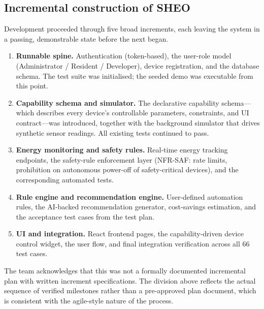 \subsection{Incremental construction of SHEO}

Development proceeded through five broad increments, each leaving the system in a passing,
demonstrable state before the next began.

\begin{enumerate}[leftmargin=*, label=\textbf{Increment \arabic{enumi}.}]
  \item \textbf{Runnable spine.} Authentication (token-based), the user-role model
        (Administrator / Resident / Developer), device registration, and the database
        schema. The test suite was initialised; the seeded demo was executable from this
        point.

  \item \textbf{Capability schema and simulator.} The declarative capability schema---which
        describes every device's controllable parameters, constraints, and UI contract---was
        introduced, together with the background simulator that drives synthetic sensor
        readings. All existing tests continued to pass.

  \item \textbf{Energy monitoring and safety rules.} Real-time energy tracking endpoints,
        the safety-rule enforcement layer (NFR-SAF: rate limits, prohibition on autonomous
        power-off of safety-critical devices), and the corresponding automated tests.

  \item \textbf{Rule engine and recommendation engine.} User-defined automation rules, the
        AI-backed recommendation generator, cost-savings estimation, and the acceptance
        test cases from the test plan.

  \item \textbf{UI and integration.} React frontend pages, the capability-driven device
        control widget, the user flow, and final integration verification across all 66
        test cases.
\end{enumerate}

The team acknowledges that this was not a formally documented incremental plan with written
increment specifications. The division above reflects the actual sequence of verified
milestones rather than a pre-approved plan document, which is consistent with the
agile-style nature of the process.

